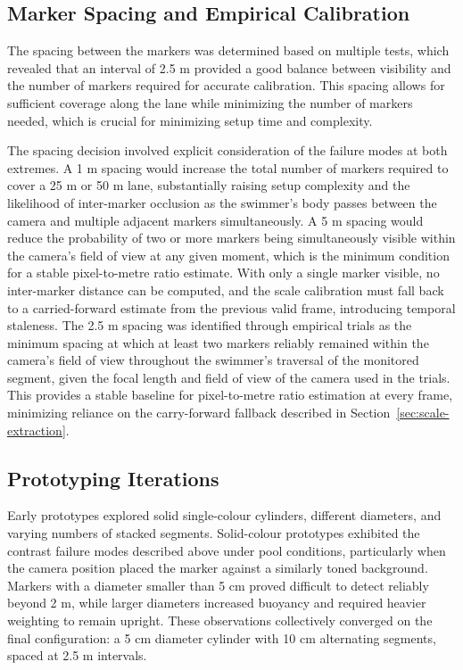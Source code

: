 \subsection{Marker Spacing and Empirical Calibration}

The spacing between the markers was determined based on multiple tests, which revealed that an
interval of 2.5 m provided a good balance between visibility and the number of markers required
for accurate calibration. This spacing allows for sufficient coverage along the lane while
minimizing the number of markers needed, which is crucial for minimizing setup time and
complexity.

The spacing decision involved explicit consideration of the failure modes at both extremes. A
1 m spacing would increase the total number of markers required to cover a 25 m or 50 m lane,
substantially raising setup complexity and the likelihood of inter-marker occlusion as the
swimmer's body passes between the camera and multiple adjacent markers simultaneously. A 5 m
spacing would reduce the probability of two or more markers being simultaneously visible within
the camera's field of view at any given moment, which is the minimum condition for a stable
pixel-to-metre ratio estimate. With only a single marker visible, no inter-marker distance can
be computed, and the scale calibration must fall back to a carried-forward estimate from the
previous valid frame, introducing temporal staleness. The 2.5 m spacing was identified through
empirical trials as the minimum spacing at which at least two markers reliably remained within
the camera's field of view throughout the swimmer's traversal of the monitored segment, given
the focal length and field of view of the camera used in the trials. This provides a stable
baseline for pixel-to-metre ratio estimation at every frame, minimizing reliance on the
carry-forward fallback described in Section~\ref{sec:scale-extraction}.

\subsection{Prototyping Iterations}

Early prototypes explored solid single-colour cylinders, different diameters, and varying
numbers of stacked segments. Solid-colour prototypes exhibited the contrast failure modes
described above under pool conditions, particularly when the camera position placed the marker
against a similarly toned background. Markers with a diameter smaller than 5 cm proved
difficult to detect reliably beyond 2 m, while larger diameters increased buoyancy and
required heavier weighting to remain upright. These observations collectively converged on the final configuration: a 5 cm diameter cylinder with 10 cm alternating segments, spaced at 2.5 m intervals.

